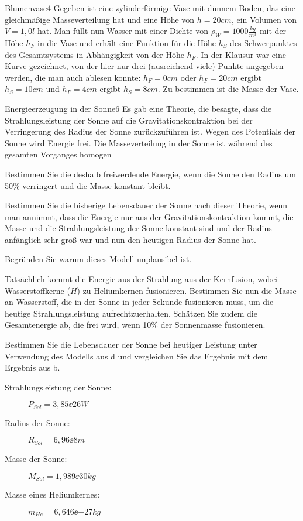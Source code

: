 

\begin{problem}{Blumenvase}{4}
Gegeben ist eine zylinderförmige Vase mit dünnem Boden, das eine gleichmäßige Masseverteilung hat und eine Höhe von $h=20\unit{cm}$, ein Volumen von $V=1,0\unit{l}$ hat. Man füllt nun Wasser mit einer Dichte von $\rho_W=1000\unit{\frac{kg}{m^3}}$ mit der Höhe $h_F$ in die Vase und erhält eine Funktion für die Höhe $h_S$ des Schwerpunktes des Gesamtsystems in Abhängigkeit von der Höhe $h_F$. In der Klausur war eine Kurve gezeichnet, von der hier nur drei (ausreichend viele) Punkte angegeben werden, die man auch ablesen konnte: $h_F=0\unit{cm}$ oder $h_F=20\unit{cm}$ ergibt $h_S=10\unit{cm}$ und $h_F=4\unit{cm}$ ergibt $h_S=8\unit{cm}$. Zu bestimmen ist die Masse der Vase.
\end{problem}

\begin{problem}{Energieerzeugung in der Sonne}{6}
Es gab eine Theorie, die besagte, dass die Strahlungsleistung der Sonne auf die Gravitationskontraktion bei der Verringerung des Radius der Sonne zurückzuführen ist. Wegen des Potentials der Sonne wird Energie frei. Die Masseverteilung in der Sonne ist während des gesamten Vorganges homogen
\begin{abcenum}
   \item Bestimmen Sie die deshalb freiwerdende Energie, wenn die Sonne den Radius um 50\% verringert und die Masse konstant bleibt.
  \item Bestimmen Sie die bisherige Lebensdauer der Sonne nach dieser Theorie, wenn man annimmt, dass die Energie nur aus der Gravitationskontraktion kommt, die Masse und die Strahlungsleistung der Sonne konstant sind und der Radius anfänglich sehr groß war und nun den heutigen Radius der Sonne hat.
  \item Begründen Sie warum dieses Modell unplausibel ist.
  \item Tatsächlich kommt die Energie aus der Strahlung aus der Kernfusion, wobei Wasserstoffkerne ($H$) zu Heliumkernen fusionieren. Bestimmen Sie nun die Masse an Wasserstoff, die in der Sonne in jeder Sekunde fusionieren muss, um die heutige Strahlungsleistung aufrechtzuerhalten. Schätzen Sie zudem die Gesamtenergie ab, die frei wird, wenn 10\% der Sonnenmasse fusionieren.
  \item Bestimmen Sie die Lebensdauer der Sonne bei heutiger Leistung unter Verwendung des Modells aus d und vergleichen Sie das Ergebnis mit dem Ergebnis aus b.
\end{abcenum}
\begin{description}
  \item[Strahlungsleistung der Sonne:] $P_{Sol}=3,85\ee{26}\unit{W}$
  \item[Radius der Sonne:] $R_{Sol}=6,96\ee{8}\unit{m}$
  \item[Masse der Sonne:] $M_{Sol}=1,989\ee{30}\unit{kg}$
  \item[Masse eines Heliumkernes:] $m_{He}=6,646\ee{-27}\unit{kg}$
\end{description}
\end{problem}

